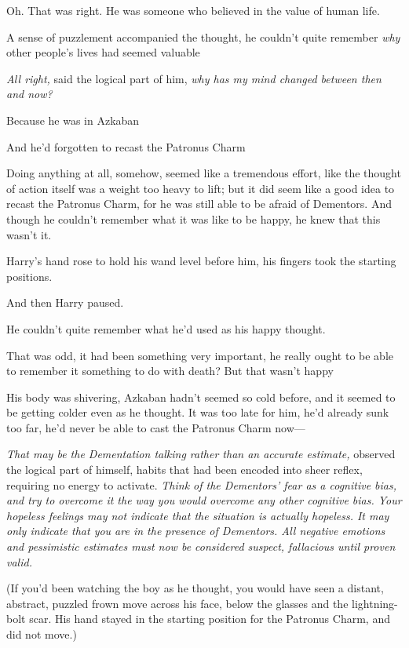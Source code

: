 Oh. That was right. He was someone who believed in the value of human life.

A sense of puzzlement accompanied the thought, he couldn't quite remember
\emph{why} other people's lives had seemed valuable{\el}

\emph{All right,} said the logical part of him, \emph{why has my mind changed
between then and now?}

Because he was in Azkaban{\el}

And he'd forgotten to recast the Patronus Charm{\el}

Doing anything at all, somehow, seemed like a tremendous effort, like the
thought of action itself was a weight too heavy to lift; but it did seem like a
good idea to recast the Patronus Charm, for he was still able to be afraid of
Dementors. And though he couldn't remember what it was like to be happy, he
knew that this wasn't it.

Harry's hand rose to hold his wand level before him, his fingers took the
starting positions.

And then Harry paused.

He couldn't{\el} quite remember{\el} what he'd used as his happy thought.

That was odd, it had been something very important, he really ought to be able
to remember it{\el} something to do with death? But that wasn't happy{\el}

His body was shivering, Azkaban hadn't seemed so cold before, and it seemed to
be getting colder even as he thought. It was too late for him, he'd already
sunk too far, he'd never be able to cast the Patronus Charm now---

\emph{That may be the Dementation talking rather than an accurate estimate,}
observed the logical part of himself, habits that had been encoded into sheer
reflex, requiring no energy to activate. \emph{Think of the Dementors' fear as
a cognitive bias, and try to overcome it the way you would overcome any other
cognitive bias. Your hopeless feelings may not indicate that the situation is
actually hopeless. It may only indicate that you are in the presence of
Dementors. All negative emotions and pessimistic estimates must now be
considered suspect, fallacious until proven valid.}

(If you'd been watching the boy as he thought, you would have seen a distant,
abstract, puzzled frown move across his face, below the glasses and the
lightning-bolt scar. His hand stayed in the starting position for the Patronus
Charm, and did not move.)

